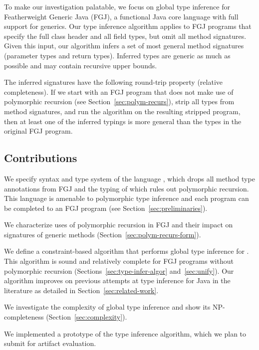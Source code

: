 To make our investigation palatable, we focus on global type inference for Featherweight
Generic Java \cite{DBLP:journals/toplas/IgarashiPW01} (FGJ), a
functional Java core language with full support for generics. Our type inference algorithm
applies to FGJ programs that specify the full class header and all field types,
but omit all method signatures. 
Given this input, our algorithm
infers a set of most general method signatures (parameter types and return types).
Inferred types are generic as much as possible and may contain
recursive upper bounds.

The inferred signatures have the following round-trip property
(relative completeness). If we
start with an FGJ program that does not make use of polymorphic
recursion (see Section~\ref{sec:polym-recurs}), strip all types from
method signatures, and run the algorithm on the 
resulting stripped program, then at least one of the inferred typings is more
general than the types in the original FGJ program.






\subsection*{Contributions}
\label{sec:contributions}


We specify syntax and type system of the language \FGJGT, which drops all method type
annotations from FGJ and the typing of which rules out polymorphic
recursion. This language is amenable to polymorphic type inference and
each \FGJGT program can be completed to an FGJ program (see Section~\ref{sec:preliminaries}). 

We characterize uses of polymorphic recursion in FGJ and their impact
on signatures of generic methods (Section~\ref{sec:polym-recurs-form}). 

We define a constraint-based algorithm that performs global type
inference for \FGJGT. This algorithm is sound and relatively complete
for FGJ programs without polymorphic recursion
(Sections~\ref{sec:type-infer-algor} and~\ref{sec:unify}). Our algorithm improves
on previous attempts at type inference for Java in the literature as detailed in
Section~\ref{sec:related-work}. 

We investigate the complexity of global type inference and show its NP-completeness (Section~\ref{sec:complexity}).

We implemented a prototype of the type inference algorithm, which we
plan to submit for artifact evaluation.

